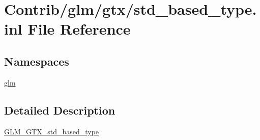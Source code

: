 \hypertarget{std__based__type_8inl}{}\section{Contrib/glm/gtx/std\+\_\+based\+\_\+type.inl File Reference}
\label{std__based__type_8inl}
\subsection*{Namespaces}
\begin{DoxyCompactItemize}
\item 
 \mbox{\hyperlink{namespaceglm}{glm}}
\end{DoxyCompactItemize}


\subsection{Detailed Description}
\mbox{\hyperlink{group__gtx__std__based__type}{G\+L\+M\+\_\+\+G\+T\+X\+\_\+std\+\_\+based\+\_\+type}} 